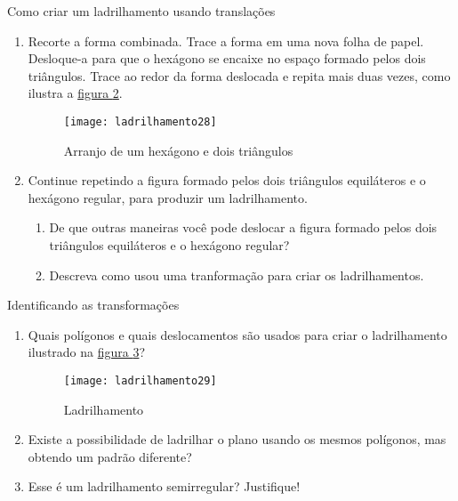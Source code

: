 {\begin{task}{Como criar um ladrilhamento usando translações}
\begin{enumerate}
	\begin{figure}[H]
	\centering
	\texttt{[image: ladrilhamento27]}
	\caption{Arranjo de um hexágono e dois triângulos}
	\label{transf1}
	\end{figure}

	\item Recorte a forma combinada. Trace a forma em uma nova folha de papel. Desloque-a para que o hexágono se encaixe no espaço formado pelos dois triângulos. Trace ao redor da forma deslocada e repita mais duas vezes, como ilustra a \hyperref[transf2]{figura \ref{transf2}}.

	\begin{figure}[H]
	\centering
	\texttt{[image: ladrilhamento28]}
	\caption{Arranjo de um hexágono e dois triângulos}
	\label{transf2}
	\end{figure}
	
\item Continue repetindo a figura formado pelos dois triângulos equiláteros e o hexágono regular, para produzir um ladrilhamento.	
	
	\begin{enumerate}
		\item De que outras maneiras você pode deslocar a figura formado pelos dois triângulos equiláteros e o hexágono regular?
		
	\item Descreva como usou uma tranformação para criar os ladrilhamentos.

\end{enumerate}
\end{enumerate}
\end{task}

\begin{task}{Identificando as transformações}

\begin{enumerate}
	\item Quais polígonos e quais deslocamentos são usados para criar o ladrilhamento ilustrado na \hyperref[transf3]{figura \ref{transf3}}?
	
	\begin{figure}[H]
	\centering
	\texttt{[image: ladrilhamento29]}
	\caption{Ladrilhamento}
	\label{transf3}
	\end{figure}
	
	\item Existe a possibilidade de ladrilhar o plano usando os mesmos polígonos,  mas obtendo um padrão diferente?
	\item Esse é um ladrilhamento semirregular? Justifique!
\end{enumerate}
\end{task}


}
